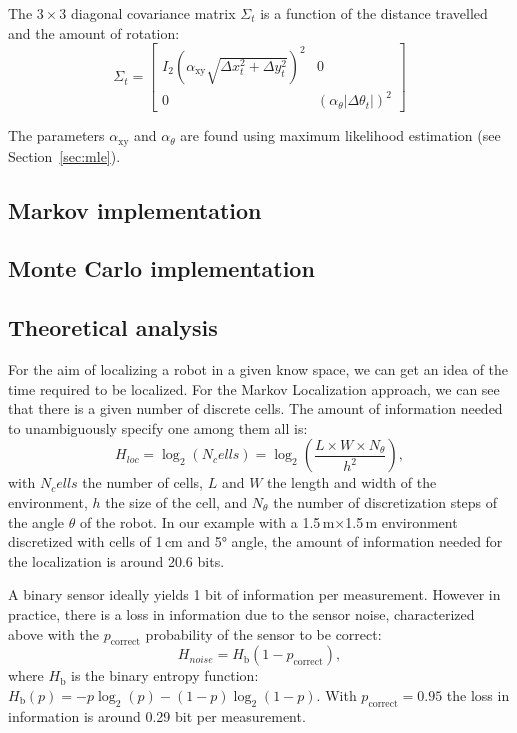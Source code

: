 \documentclass[letterpaper, 10pt, conference]{ieeeconf}
\newcommand{\sect}[1]{Section~\ref{sec:#1}}
\begin{document}
The $3\times3$ diagonal covariance matrix $\Sigma_t$ is a function of the distance travelled and the amount of rotation:
\begin{equation}
\Sigma_t=\begin{bmatrix} I_2 ( \alpha_\mathrm{xy} \sqrt{\Delta x_{t}^2 + \Delta y_{t}^2})^2  & 0 \\ 0 & (\alpha_\theta | \Delta \theta_t |)^2 \end{bmatrix}
\end{equation}


The parameters $\alpha_\mathrm{xy}$ and $\alpha_\theta$ are found using maximum likelihood estimation (see \sect{mle}).

\subsection{Markov implementation}


\subsection{Monte Carlo implementation}

\subsection{Theoretical analysis}
For the aim of localizing a robot in a given know space, we can get an idea of the time required to be localized.
For the Markov Localization approach, we can see that there is a given number of discrete cells.
The amount of information needed to unambiguously specify one among them all is:
\begin{displaymath}
	H_{loc} = \log_2(N_cells) = \log_2\left(\frac{L\times W\times N_{\theta}}{h^2}\right),
\end{displaymath}
with $N_cells$ the number of cells, $L$ and $W$ the length and width of the environment, $h$ the size of the cell, and $N_{\theta}$ the number of discretization steps of the angle $\theta$ of the robot.
In our example with a 1.5\,m$\times$1.5\,m environment discretized with cells of 1\,cm and 5° angle, the amount of information needed for the localization is around 20.6 bits.

A binary sensor ideally yields 1 bit of information per measurement.
However in practice, there is a loss in information due to the sensor noise, characterized above with the $p_{\mbox{correct}}$ probability of the sensor to be correct:
\begin{displaymath}
	H_{noise} = H_{\mbox{b}}(1 - p_{\mbox{correct}}),
\end{displaymath}
where $H_{\mbox{b}}$ is the binary entropy function: $H_{\mbox{b}}(p) = -p\log_2(p) - (1-p)\log_2(1-p)$.
With $p_{\mbox{correct}}=0.95$ the loss in information is around 0.29 bit per measurement.
\end{document}
